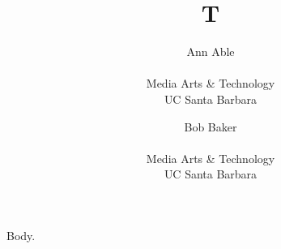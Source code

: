 \documentclass{article}
\begin{document}
\title{T}
\author{Ann Able\\
\parbox{1.4in}{\scriptsize \centering Media Arts \& Technology \\ UC Santa Barbara}
\and Bob Baker\\
\parbox{1.4in}{\scriptsize \centering Media Arts \& Technology \\ UC Santa Barbara}}
\maketitle
Body.
\end{document}
